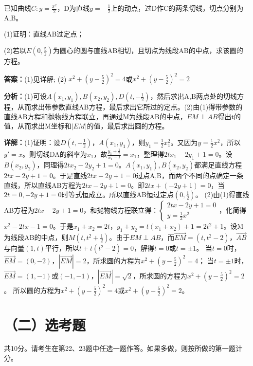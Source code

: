 \begin{question}[points=12]
已知曲线$C:y=\frac{x^2}{2}$，D为直线$y=-\frac{1}{2}$上的动点，过D作C的两条切线，切点分别为A,B。

(1)证明：直线AB过定点；

(2)若以$E(0,\frac{5}{2})$为圆心的圆与直线AB相切，且切点为线段AB的中点，求该圆的方程。
\begin{solution}
\textbf{答案：}(1)见详解; (2) $x^2+(y-\frac{5}{2})^2=4$或$x^2+(y-\frac{5}{2})^2=2$

\textbf{分析：}(1)可设$A(x_1,y_1),B(x_2,y_2),D(t,-\frac{1}{2})$，然后求出A,B两点处的切线方程，从而求出带参数直线AB方程，最后求出它所过的定点。(2)由(1)得带参数的直线AB方程和抛物线方程联立，再通过M为线段AB的中点，$EM\perp AB$得出t的值，从而求出M坐标和$|EM|$的值，最后求出圆的方程。

\textbf{详解：}(1)证明：设$D(t,-\frac{1}{2})$，$A(x_1,y_1)$，则$y_1=\frac{1}{2}x_1^2$。又因为$y=\frac{1}{2}x^2$，所以$y'=x$。则切线DA的斜率为$x_1$，故$\frac{y_1+\frac{1}{2}}{x_1-t}=x_1$，整理得$2tx_1-2y_1+1=0$。设$B(x_2,y_2)$，同理得$2tx_2-2y_2+1=0$。$A(x_1,y_1),B(x_2,y_2)$都满足直线方程$2tx-2y+1=0$。于是直线$2tx-2y+1=0$过点A,B，而两个不同的点确定一条直线，所以直线AB方程为$2tx-2y+1=0$。即$2tx+(-2y+1)=0$，当$2t=0,-2y+1=0$时等式恒成立。所以直线AB恒过定点$(0,\frac{1}{2})$。
(2)由(1)得直线AB方程为$2tx-2y+1=0$，和抛物线方程联立得：$\begin{cases} 2tx-2y+1=0 \\ y=\frac{1}{2}x^2 \end{cases}$，化简得$x^2-2tx-1=0$。于是$x_1+x_2=2t$，$y_1+y_2=t(x_1+x_2)+1=2t^2+1$。设M为线段AB的中点，则$M(t,t^2+\frac{1}{2})$。由于$EM\perp AB$，而$\overrightarrow{EM}=(t,t^2-2)$，$\overrightarrow{AB}$与向量$(1,t)$平行，所以$t+t(t^2-2)=0$，解得$t=0$或$t=\pm1$。
当$t=0$时，$\overrightarrow{EM}=(0,-2)$，$|\overrightarrow{EM}|=2$，所求圆的方程为$x^2+(y-\frac{5}{2})^2=4$；
当$t=\pm1$时，$\overrightarrow{EM}=(1,-1)$或$(-1,-1)$，$|\overrightarrow{EM}|=\sqrt{2}$，所求圆的方程为$x^2+(y-\frac{5}{2})^2=2$。
所以圆的方程为$x^2+(y-\frac{5}{2})^2=4$或$x^2+(y-\frac{5}{2})^2=2$。
\end{solution}
\end{question}

\section*{（二）选考题}
共10分。请考生在第22、23题中任选一题作答。如果多做，则按所做的第一题计分。

